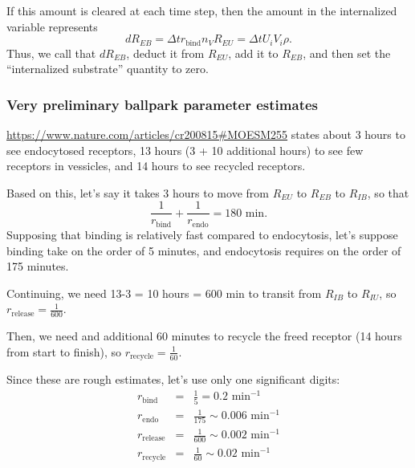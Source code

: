 \documentclass[12point]{article}
\begin{document}
If this amount is cleared at each time step, then the amount in the internalized variable 
represents 
\begin{equation}
dR_{EB} = \Delta t r_\textrm{bind} n_V R_{EU} = \Delta t U_i V_i \rho.
\end{equation}
Thus, we call that $dR_{EB}$, deduct it from $R_{EU}$, add it to $R_{EB}$, and then 
set the ``internalized substrate'' quantity to zero. 

\subsubsection{Very preliminary ballpark parameter estimates}
\href{https://www.nature.com/articles/cr200815#MOESM255}{https://www.nature.com/articles/cr200815\#MOESM255} states about 3 hours to see endocytosed receptors, 13 hours (3 + 10 additional hours) to see few receptors in vessicles, and 14 hours to see recycled receptors. 

Based on this, let's say it takes 3 hours to move from $R_{EU}$ to $R_{EB}$ to $R_{IB}$, so that
\begin{equation}
\frac{ 1 }{ r_\textrm{bind}} + \frac{1}{r_\textrm{endo}} = 180 \textrm{ min}. 
\end{equation}
Supposing that binding is relatively fast compared to endocytosis, let's suppose binding take on the order of 5 minutes, and endocytosis requires on the order of 175 minutes. 

Continuing, we need 13-3 = 10 hours = 600 min to transit from $R_{IB}$ to $R_{IU}$, so $r_\textrm{release} = \frac{1}{600}$. 

Then, we need and additional 60 minutes to recycle the freed receptor (14 hours from start to finish), so $r_\textrm{recycle} = \frac{1}{60}.$ 

Since these are rough estimates, let's use only one significant digits: 
\begin{eqnarray}
r_\textrm{bind} & = & \frac{1}{5} = 0.2 \textrm{ min}^{-1} \\ 
r_\textrm{endo} & = & \frac{1}{175} \sim 0.006 \textrm{ min}^{-1} \\ 
r_\textrm{release} & = & \frac{1}{600} \sim 0.002 \textrm{ min}^{-1} \\ 
r_\textrm{recycle} & = & \frac{1}{60} \sim 0.02 \textrm{ min}^{-1} \\ 
\end{eqnarray}
\end{document}
